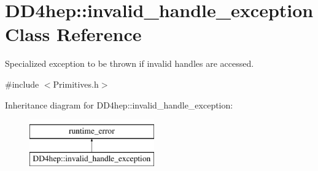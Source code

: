 \hypertarget{class_d_d4hep_1_1invalid__handle__exception}{}\section{D\+D4hep\+:\+:invalid\+\_\+handle\+\_\+exception Class Reference}
\label{class_d_d4hep_1_1invalid__handle__exception}


Specialized exception to be thrown if invalid handles are accessed.  




{\ttfamily \#include $<$Primitives.\+h$>$}

Inheritance diagram for D\+D4hep\+:\+:invalid\+\_\+handle\+\_\+exception\+:\begin{figure}[H]
\begin{center}
\leavevmode
\includegraphics[height=2.000000cm]{class_d_d4hep_1_1invalid__handle__exception}
\end{center}
\end{figure}
